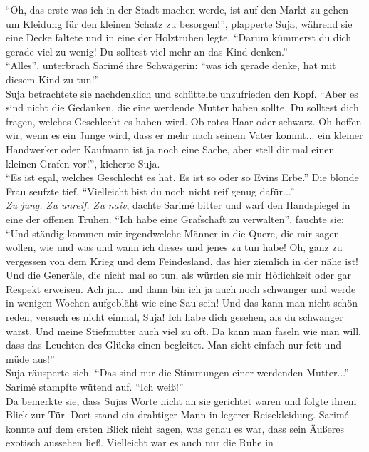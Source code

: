 ``Oh, das erste was ich in der Stadt machen werde, ist auf den Markt zu gehen um Kleidung für den 
kleinen Schatz zu besorgen!'', plapperte Suja, während sie eine Decke faltete und in eine der 
Holztruhen legte. ``Darum kümmerst du dich gerade viel zu wenig! Du solltest viel mehr an das Kind 
denken.''\\
``Alles'', unterbrach Sarimé ihre Schwägerin: ``was ich gerade denke, hat mit diesem Kind zu 
tun!''\\
Suja betrachtete sie nachdenklich und schüttelte unzufrieden den Kopf. ``Aber es sind nicht die 
Gedanken, die eine werdende Mutter haben sollte. Du solltest dich fragen, welches Geschlecht es 
haben wird. Ob rotes Haar oder schwarz. Oh hoffen wir, wenn es ein Junge wird, dass er mehr nach 
seinem Vater kommt... ein kleiner Handwerker oder Kaufmann ist ja noch eine Sache, aber stell dir 
mal einen kleinen Grafen vor!'', kicherte Suja.\\
``Es ist egal, welches Geschlecht es hat. Es ist so oder so Evins Erbe.''
Die blonde Frau seufzte tief. ``Vielleicht bist du noch nicht reif genug dafür...''\\
\textit{Zu jung. Zu unreif. Zu naiv}, dachte Sarimé bitter und warf den Handspiegel in eine der 
offenen Truhen. ``Ich habe eine Grafschaft zu verwalten'', fauchte sie: ``Und ständig kommen mir 
irgendwelche Männer in die Quere, die mir sagen wollen, wie und was und wann ich dieses und jenes 
zu tun habe! Oh, ganz zu vergessen von dem Krieg und dem Feindesland, das hier ziemlich in der nähe 
ist! Und die Generäle, die nicht mal so tun, als würden sie mir Höflichkeit oder gar Respekt 
erweisen. Ach ja... und dann bin ich ja auch noch schwanger und werde in wenigen Wochen aufgebläht 
wie eine Sau sein! Und das kann man nicht schön reden, versuch es nicht einmal, Suja! Ich habe dich 
gesehen, als du schwanger warst. Und meine Stiefmutter auch viel zu oft. Da kann man faseln wie man 
will, dass das Leuchten des Glücks einen begleitet. Man sieht einfach nur fett und müde aus!''\\
Suja räusperte sich. ``Das sind nur die Stimmungen einer werdenden Mutter...''\\
Sarimé stampfte wütend auf. ``Ich weiß!''\\
Da bemerkte sie, dass Sujas Worte nicht an sie gerichtet waren und folgte ihrem Blick zur Tür. Dort 
stand ein drahtiger Mann in legerer Reisekleidung. Sarimé konnte auf dem ersten Blick nicht sagen, 
was genau es war, dass sein Äußeres exotisch aussehen ließ. Vielleicht war es auch nur die Ruhe in 
